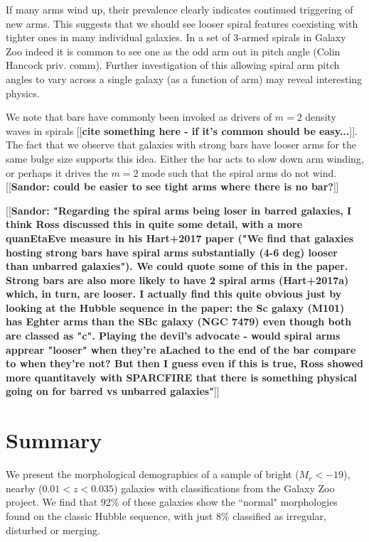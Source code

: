 \documentclass[usenatbib]{mn2e}
\newcommand{\comment}[2][todo]{{\color{#1}[[{\bf #2}]]}}
\begin{document}
If many arms wind up, their prevalence clearly indicates continued triggering of new arms. This suggests that we should see
looser spiral features coexisting with tighter ones in many individual galaxies. In a set of 3-armed spirals in Galaxy Zoo indeed it is 
common to see one as the odd arm out in pitch angle (Colin Hancock priv. comm). Further investigation of this allowing spiral arm pitch angles to vary across a single galaxy (as a function of arm) may reveal interesting physics. 

 We note that bars have commonly been invoked as drivers of $m=2$ density waves in spirals \comment{cite something here - if it's common should be easy...}. The fact that we observe that galaxies with strong bars have looser arms for the same bulge size supports this idea. Either the bar acts to slow down arm winding, or perhaps it drives the $m=2$ mode such that the spiral arms do not wind. \comment{Sandor: could be easier to see tight arms where there is no bar?}

\comment{Sandor: "Regarding the spiral arms being loser in barred galaxies, I think Ross discussed this in quite some detail, with a more quanEtaEve measure in his Hart+2017 paper ("We find that galaxies hosting strong bars have spiral arms substantially (4-6 deg) looser than unbarred galaxies"). We could quote some of this in the paper. Strong bars are also more likely to have 2 spiral arms (Hart+2017a) which, in turn, are looser. I actually find this quite obvious just by looking at the Hubble sequence in the paper: the Sc galaxy (M101) has Eghter arms than the SBc galaxy (NGC 7479) even though both are classed as "c". Playing the devil's advocate - would spiral arms apprear "looser" when they're aLached to the end of the bar compare to when they're not? But then I guess even if this is true, Ross showed more quantitavely with SPARCFIRE that there is something physical going on for barred vs unbarred galaxies"}


\section{Summary}

We present the morphological demographics of a sample of bright ($M_r <-19$), nearby ($0.01<z<0.035$) galaxies with classifications from the Galaxy Zoo project. We find that {92\%} of these galaxies show the ``normal" morphologies found on the classic Hubble sequence, with just {8\%} classified as irregular, disturbed or merging. 
\end{document}
